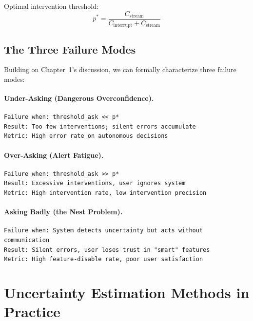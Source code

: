 Optimal intervention threshold:
\[
p^* = \frac{C_{\text{stream}}}{C_{\text{interrupt}} + C_{\text{stream}}}
\]

\subsection{The Three Failure Modes}

Building on Chapter~1's discussion, we can formally characterize three failure modes:

\paragraph{Under-Asking (Dangerous Overconfidence).}
\begin{lstlisting}[language={}, caption={Under-asking failure mode}]
Failure when: threshold_ask << p*
Result: Too few interventions; silent errors accumulate
Metric: High error rate on autonomous decisions
\end{lstlisting}

\paragraph{Over-Asking (Alert Fatigue).}
\begin{lstlisting}[language={}, caption={Over-asking failure mode}]
Failure when: threshold_ask >> p*
Result: Excessive interventions, user ignores system
Metric: High intervention rate, low intervention precision
\end{lstlisting}

\paragraph{Asking Badly (the Nest Problem).}
\begin{lstlisting}[language={}, caption={Asking badly failure mode}]
Failure when: System detects uncertainty but acts without communication
Result: Silent errors, user loses trust in "smart" features
Metric: High feature-disable rate, poor user satisfaction
\end{lstlisting}

\section{Uncertainty Estimation Methods in Practice}

